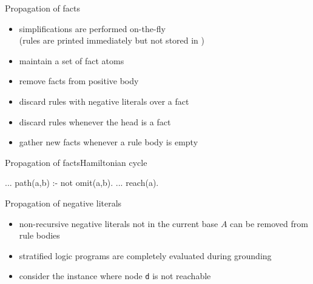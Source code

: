 \begin{frame}{Propagation of facts}
  \bigskip
  \begin{itemize}
    \item simplifications are performed \alert{on-the-fly}\\
      (rules are printed immediately but not stored in \gringo)
    \item maintain a set of \alert{fact atoms}
    \item remove facts from positive body
    \item discard rules with negative literals over a fact
    \item discard rules whenever the head is a fact
    \item gather new facts whenever a rule body is empty
  \end{itemize}
\end{frame}
\begin{frame}[fragile]{Propagation of facts}{Hamiltonian cycle}
  \bigskip
  \begin{SemiVerbatim}{.9}
...
path(a,b) :- not omit(a,b).
...
reach(a). {}
\end{SemiVerbatim}
\end{frame}
\begin{frame}{Propagation of negative literals}
  \bigskip
  \begin{itemize}
    \item \alert{non-recursive negative literals} not in the current base \(A\) can be removed from rule bodies
    \item \alert{stratified} logic programs are \alert{completely evaluated} during grounding
    \item consider the instance where node \texttt{d} is not reachable
  \end{itemize}
  \hspace{1em}
  \begin{center}
    \Graph[draw=none]
  \end{center}
\end{frame}
